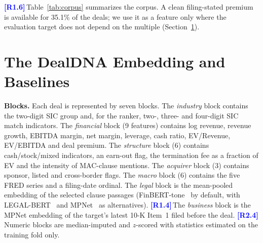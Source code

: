 \documentclass[conference]{IEEEtran}
\newcommand{\rc}[1]{\textcolor{blue}{\textbf{[#1]}}\,}
\newcommand{\rc}[1]{}
\begin{document}
\begin{table}[t]
\centering
\caption{Corpus composition and field coverage (2{,}416 deals, 65 two-digit SIC groups, 2013--2025).}
\label{tab:corpus}
\footnotesize
\setlength{\tabcolsep}{3pt}
\end{table}

\rc{R1.6}Table~\ref{tab:corpus} summarizes the corpus. A clean filing-stated premium is available for 35.1\% of the deals; we use it as a feature only where the evaluation target does not depend on the multiple (Section~\ref{sec:embedding}).

\section{The DealDNA Embedding and Baselines}
\label{sec:embedding}

\noindent\textbf{Blocks.}
Each deal is represented by seven blocks. The \emph{industry} block contains the two-digit SIC group and, for the ranker, two-, three- and four-digit SIC match indicators. The \emph{financial} block (9 features) contains log revenue, revenue growth, EBITDA margin, net margin, leverage, cash ratio, EV/Revenue, EV/EBITDA and deal premium. The \emph{structure} block (6) contains cash/stock/mixed indicators, an earn-out flag, the termination fee as a fraction of EV and the intensity of MAC-clause mentions. The \emph{acquirer} block (3) contains sponsor, listed and cross-border flags. The \emph{macro} block (6) contains the five FRED series and a filing-date ordinal. The \emph{legal} block is the mean-pooled embedding of the selected clause passages (FinBERT-tone~\cite{huang2023} by default, with LEGAL-BERT~\cite{chalkidis2020} and MPNet~\cite{song2020} as alternatives). \rc{R1.4}The \emph{business} block is the MPNet embedding of the target's latest 10-K Item~1 filed before the deal. \rc{R2.4}Numeric blocks are median-imputed and $z$-scored with statistics estimated on the training fold only.
\end{document}
